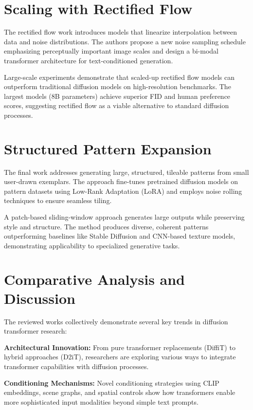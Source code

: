 \documentclass[a4paper]{article}
\begin{document}
\section{Scaling with Rectified Flow}

The rectified flow work introduces models that linearize interpolation between data and noise distributions. The authors propose a new noise sampling schedule emphasizing perceptually important image scales and design a bi-modal transformer architecture for text-conditioned generation.

Large-scale experiments demonstrate that scaled-up rectified flow models can outperform traditional diffusion models on high-resolution benchmarks. The largest models (8B parameters) achieve superior FID and human preference scores, suggesting rectified flow as a viable alternative to standard diffusion processes.

\section{Structured Pattern Expansion}

The final work addresses generating large, structured, tileable patterns from small user-drawn exemplars. The approach fine-tunes pretrained diffusion models on pattern datasets using Low-Rank Adaptation (LoRA) and employs noise rolling techniques to ensure seamless tiling.

A patch-based sliding-window approach generates large outputs while preserving style and structure. The method produces diverse, coherent patterns outperforming baselines like Stable Diffusion and CNN-based texture models, demonstrating applicability to specialized generative tasks.

\section{Comparative Analysis and Discussion}

The reviewed works collectively demonstrate several key trends in diffusion transformer research:

\textbf{Architectural Innovation:} From pure transformer replacements (DiffiT) to hybrid approaches (D2iT), researchers are exploring various ways to integrate transformer capabilities with diffusion processes.

\textbf{Conditioning Mechanisms:} Novel conditioning strategies using CLIP embeddings, scene graphs, and spatial controls show how transformers enable more sophisticated input modalities beyond simple text prompts.
\end{document}
